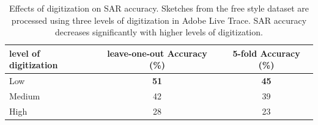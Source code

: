 
\vspace{-1mm}
\begin{table}[!htbp]
\caption {Effects of digitization on SAR accuracy. Sketches from the free style dataset are processed using three levels of digitization in Adobe Live Trace. SAR accuracy decreases significantly with higher levels of digitization.}
\label{table:digitization}
\vspace{-2mm}
\centering
\small
\begin{tabular}{>{\centering}m{2.0cm}| c | c}
level of digitization& leave-one-out Accuracy (\%) & 5-fold Accuracy (\%)\\ \hline

Low       & \textbf{51} &  \textbf{45}\\
Medium       & 42 &  39\\
High      & 28 &  23\\
\end{tabular}\vspace{-2mm}
\end{table}


